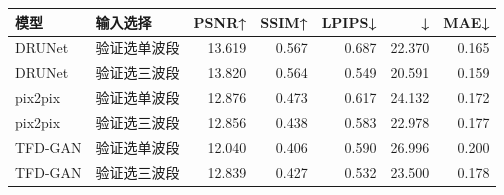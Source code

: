 \begin{tabular}{@{}llrrrrr@{}}
\toprule
模型 & 输入选择 & PSNR↑ & SSIM↑ & LPIPS↓ & \dE{}↓ & MAE↓\\
\midrule
DRUNet & 验证选单波段 & 13.619 & 0.567 & 0.687 & 22.370 & 0.165\\
DRUNet & 验证选三波段 & 13.820 & 0.564 & 0.549 & 20.591 & 0.159\\
pix2pix & 验证选单波段 & 12.876 & 0.473 & 0.617 & 24.132 & 0.172\\
pix2pix & 验证选三波段 & 12.856 & 0.438 & 0.583 & 22.978 & 0.177\\
TFD-GAN & 验证选单波段 & 12.040 & 0.406 & 0.590 & 26.996 & 0.200\\
TFD-GAN & 验证选三波段 & 12.839 & 0.427 & 0.532 & 23.500 & 0.178\\
\bottomrule
\end{tabular}
